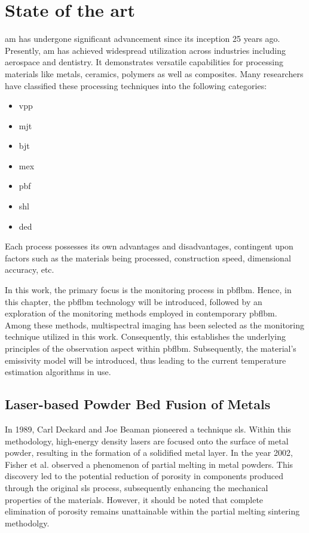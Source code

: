\chapter{State of the art}%
\gls{am} has undergone significant advancement since its inception 25 years 
ago\cite{J.Scott.2012}. Presently, \gls{am} has achieved widespread 
utilization across industries including aerospace and dentistry. 
It demonstrates versatile capabilities for processing materials 
like metals, ceramics, polymers as well as composites\cite{Frazier.2014}.
Many researchers have classified these processing techniques into the following 
categories\cite{Kruth.1991,Hartke.2011}:

\begin{itemize}
    \item \gls{vpp}
    \item \gls{mjt}
    \item \gls{bjt}
    \item \gls{mex}
    \item \gls{pbf}
    \item \gls{shl}
    \item \gls{ded}
\end{itemize}

Each process possesses its own advantages and disadvantages, 
contingent upon factors such as the materials being processed, 
construction speed, dimensional accuracy, etc\cite{Hartke.2011}.


In this work, the primary focus is the monitoring process in \gls{pbflbm}.
Hence, in this chapter, the \gls{pbflbm} technology will be
introduced, followed by an exploration of the monitoring methods employed 
in contemporary \gls{pbflbm}. Among these methods, multispectral imaging 
has been selected as the monitoring technique utilized in this work. 
Consequently, this establishes the underlying principles of the 
observation aspect within \gls{pbflbm}. Subsequently, the material's 
emissivity model will be introduced, thus leading to the current 
temperature estimation algorithms in use.
%
%
\section{Laser-based Powder Bed Fusion of Metals}
In 1989, Carl Deckard and Joe Beaman pioneered a technique 
\gls{sls}. Within this methodology, high-energy density lasers are 
focused onto the surface of metal powder, resulting in the formation of 
a solidified metal layer\cite{Mazzoli.2013,Wong.2012}. 
In the year 2002, Fisher et al. observed a phenomenon of partial melting 
in metal powders. This discovery led to the potential reduction of porosity 
in components produced through the original \gls{sls} process, subsequently 
enhancing the mechanical properties of the materials. However, it should be 
noted that complete elimination of porosity remains unattainable within the 
partial melting sintering methodolgy\cite{Fischer.2002}.


